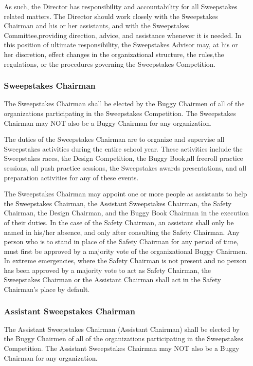 \documentclass[openany]{book}
\begin{document}
As such, the Director has responsibility and accountability for all Sweepstakes related matters. The Director should work closely with the Sweepstakes Chairman and his or her assistants, and with the Sweepstakes Committee,providing direction, advice, and assistance whenever it is needed. In this position of ultimate responsibility, the Sweepstakes Advisor may, at his or her discretion, effect changes in the organizational structure, the rules,the regulations, or the procedures governing the Sweepstakes Competition.

\subsubsection{Sweepstakes Chairman}

The Sweepstakes Chairman shall be elected by the Buggy Chairmen of all of the organizations participating in the Sweepstakes Competition. The Sweepstakes Chairman may NOT also be a Buggy Chairman for any organization.

The duties of the Sweepstakes Chairman are to organize and supervise all Sweepstakes activities during the entire school year. These activities include the Sweepstakes races, the Design Competition, the Buggy Book,all freeroll practice sessions, all push practice sessions, the Sweepstakes awards presentations, and all preparation activities for any of these events.

The Sweepstakes Chairman may appoint one or more people as assistants to help the Sweepstakes Chairman, the Assistant Sweepstakes Chairman, the Safety Chairman, the Design Chairman, and the Buggy Book Chairman in the execution of their duties. In the case of the Safety Chairman, an assistant shall only be named in his/her absence, and only after consulting the Safety Chairman. Any person who is to stand in place of the Safety Chairman for any period of time, must first be approved by a majority vote of the organizational Buggy Chairmen. In extreme emergencies, where the Safety Chairman is not present and no person has been approved by a majority vote to act as Safety Chairman, the Sweepstakes Chairman or the Assistant Chairman shall act in the Safety Chairman's place by default.

\subsubsection{Assistant Sweepstakes Chairman}
The Assistant Sweepstakes Chairman (Assistant Chairman) shall be elected by the Buggy Chairmen of all of the organizations participating in the Sweepstakes Competition. The Assistant Sweepstakes Chairman may NOT also be a Buggy Chairman for any organization.
\end{document}
